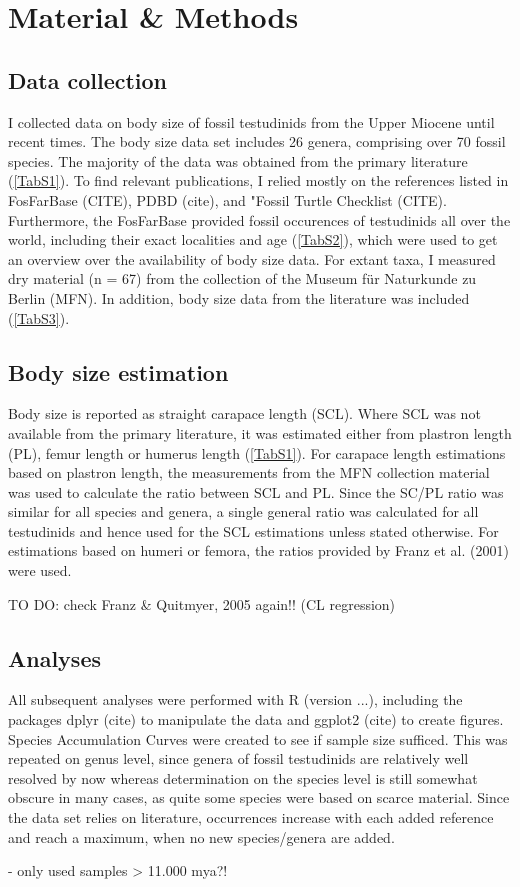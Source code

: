\section{Material \& Methods}

\subsection{Data collection}
I collected data on body size of fossil testudinids from the Upper Miocene until recent times. The body size data set includes 26 genera, comprising over 70 fossil species. The majority of the data was obtained from the primary literature (\ref{TabS1}). To find relevant publications, I relied mostly on the references listed in FosFarBase (CITE), PDBD (cite), and "Fossil Turtle Checklist (CITE).
Furthermore, the FosFarBase provided fossil occurences of testudinids all over the world, including their exact localities and age (\ref{TabS2}), which were used to get an overview over the availability of body size data. 
For extant taxa, I measured dry material (n = 67) from the collection of the Museum für Naturkunde zu Berlin (MFN). In addition, body size data from the literature was included (\ref{TabS3}).

\subsection{Body size estimation}
Body size is reported as straight carapace length (SCL). Where SCL was not available from the primary literature, it was estimated either from plastron length (PL), femur length or humerus length (\ref{TabS1}). For carapace length estimations based on plastron length, the measurements from the MFN collection material was used to calculate the ratio between SCL and PL. Since the SC/PL ratio was similar for all species and genera, a single general ratio was calculated for all testudinids and hence used for the SCL estimations unless stated otherwise. For estimations based on humeri or femora, the ratios provided by Franz et al. (2001) were used.

TO DO: check Franz \& Quitmyer, 2005 again!! (CL regression)

\subsection{Analyses}
All subsequent analyses were performed with R (version ...), including the packages dplyr (cite) to manipulate the data and ggplot2 (cite) to create figures. Species Accumulation Curves were created to see if sample size sufficed. This was repeated on genus level, since genera of fossil testudinids are relatively well resolved by now whereas determination on the species level is still somewhat obscure in many cases, as quite some species were based on scarce material. Since the data set relies on literature, occurrences increase with each added reference and reach a maximum, when no new species/genera are added.



- only used samples > 11.000 mya?!
